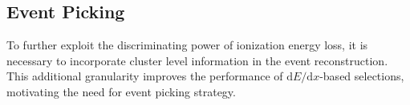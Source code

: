 \subsection{Event Picking}
\label{sec:event_picking_selections}
To further exploit the discriminating power of ionization energy loss, it is necessary to incorporate cluster level information in the event reconstruction. This additional granularity improves the performance of $\text{d}E/\text{d}x$-based selections, motivating the need for event picking strategy.














